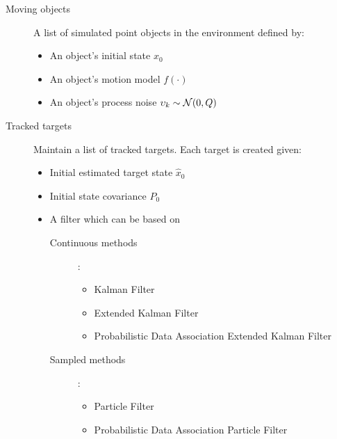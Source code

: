 \begin{description}
	\item[Moving objects] A list of simulated point objects in the environment defined by:
	\begin{itemize}
		\item An object's initial state $x_0$
		\item An object's  motion model $f(\cdot)$
		\item An object's process noise $ {\upsilon}_k \sim \mathcal{N}(0,
		{Q})$
	\end{itemize}
\end{description}

\begin{description}
	\item[Tracked targets] Maintain a list of tracked targets. Each target is created given:
	\begin{itemize}
		\item Initial estimated target state $\hat{x}_0$
		\item Initial state covariance $P_0$
		\item A filter which can be based on
			\begin{description}
				\item[Continuous methods]:
					\begin{itemize}
						\item Kalman Filter
						\item Extended Kalman Filter
						\item Probabilistic Data Association Extended Kalman Filter
					\end{itemize}		
			\end{description}
			\begin{description}
				\item[Sampled methods]:
					\begin{itemize}
						\item Particle Filter
						\item Probabilistic Data Association Particle Filter
					\end{itemize}
			\end{description}			
	\end{itemize}
\end{description}


